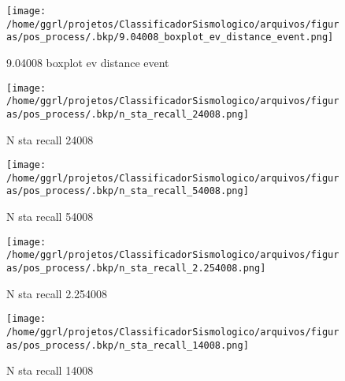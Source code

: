                     \begin{figure}[H]
                        \centering
                        \texttt{[image: /home/ggrl/projetos/ClassificadorSismologico/arquivos/figuras/pos\_process/.bkp/9.04008\_boxplot\_ev\_distance\_event.png]}
                        \caption{9.04008 boxplot ev distance event}
                        \label{fig:9.04008_boxplot_ev_distance_event}
                    \end{figure}
                

                    \begin{figure}[H]
                        \centering
                        \texttt{[image: /home/ggrl/projetos/ClassificadorSismologico/arquivos/figuras/pos\_process/.bkp/n\_sta\_recall\_24008.png]}
                        \caption{N sta recall 24008}
                        \label{fig:n_sta_recall_24008}
                    \end{figure}
                

                    \begin{figure}[H]
                        \centering
                        \texttt{[image: /home/ggrl/projetos/ClassificadorSismologico/arquivos/figuras/pos\_process/.bkp/n\_sta\_recall\_54008.png]}
                        \caption{N sta recall 54008}
                        \label{fig:n_sta_recall_54008}
                    \end{figure}
                

                    \begin{figure}[H]
                        \centering
                        \texttt{[image: /home/ggrl/projetos/ClassificadorSismologico/arquivos/figuras/pos\_process/.bkp/n\_sta\_recall\_2.254008.png]}
                        \caption{N sta recall 2.254008}
                        \label{fig:n_sta_recall_2.254008}
                    \end{figure}
                

                    \begin{figure}[H]
                        \centering
                        \texttt{[image: /home/ggrl/projetos/ClassificadorSismologico/arquivos/figuras/pos\_process/.bkp/n\_sta\_recall\_14008.png]}
                        \caption{N sta recall 14008}
                        \label{fig:n_sta_recall_14008}
                    \end{figure}
                

